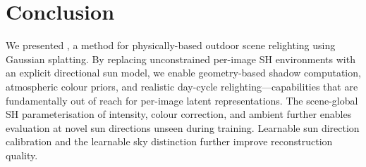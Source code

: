 \section{Conclusion}
\label{sec:conclusion}

We presented \ours{}, a method for physically-based outdoor scene relighting using Gaussian splatting.
By replacing unconstrained per-image SH environments with an explicit directional sun model, we enable geometry-based shadow computation, atmospheric colour priors, and realistic day-cycle relighting---capabilities that are fundamentally out of reach for per-image latent representations.
The scene-global SH parameterisation of intensity, colour correction, and ambient further enables evaluation at novel sun directions unseen during training.
Learnable sun direction calibration and the learnable sky distinction further improve reconstruction quality.
